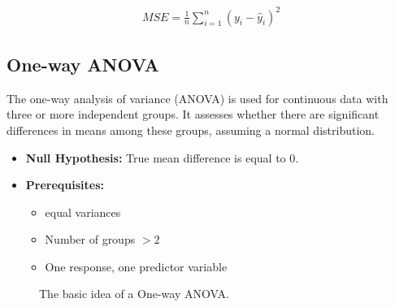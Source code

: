\documentclass[
  a4paper,
]{scrbook}
\providecommand{\tightlist}{%
  \setlength{\itemsep}{0pt}\setlength{\parskip}{0pt}}\usepackage{longtable,booktabs,array}
\begin{document}
\begin{align}
MSE = \frac{1}{n} \sum_{i=1}^{n} (y_i - \hat{y}_i)^2 \label{mse}
\end{align}

\subsection{One-way ANOVA}\label{one-way-anova}

The one-way analysis of variance (ANOVA) is used for continuous data
with three or more independent groups. It assesses whether there are
significant differences in means among these groups, assuming a normal
distribution.

\begin{itemize}
\tightlist
\item
  \textbf{Null Hypothesis:} True mean difference is equal to 0.
\item
  \textbf{Prerequisites:}

  \begin{itemize}
  \tightlist
  \item
    equal variances
  \item
    Number of groups \(>2\)
  \item
    One response, one predictor variable
  \end{itemize}
\end{itemize}

\begin{figure}[H]


\caption{\label{fig-one-way-ANOVA-basic-idea}The basic idea of a One-way
ANOVA.}

\end{figure}%
\end{document}
